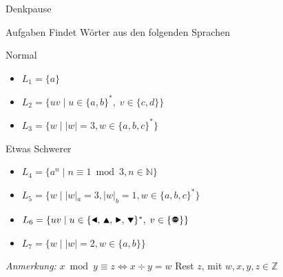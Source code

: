 {
\begin{frame}[fragile]{Denkpause}
    \footnotesize
        \begin{alertblock}{Aufgaben}
            Findet Wörter aus den folgenden Sprachen
        \end{alertblock}
        \begin{block}{Normal}
            \begin{itemize}
                \item $L_1 = \{a\}$
                \item $L_2 = \{uv\;|\;u\in\{a,b\}^\ast,\;v\in\{c,d\}\}$
                \item $L_3 = \{w\;|\;|w| = 3, w\in \{a,b,c\}^{*}\}$
            \end{itemize}
        \end{block}
        \begin{block}{Etwas Schwerer}
            \begin{itemize}
                \item $L_4 = \{a^n\;|\;n \equiv 1 \bmod 3, n\in\mathbb{N}\}$
                \item $L_5 = \{w\;|\;|w|_a = 3, |w|_b = 1, w\in \{a,b,c\}^{*}\}$
                \item $L_6 = \{uv\;|\;u\in\{\text{\Rewind, \MoveUp, \Forward, \MoveDown}\}^\ast,\;v\in\{\text{\Stopsign}\}\}$
                \item $L_7 = \{w \mid |w| = 2, w\in \{a,b\}\}$
            \end{itemize}
        \end{block}
        \emph{Anmerkung:} $x \bmod y \equiv z \iff x\div y = w$ Rest $z$, mit $w,x,y,z \in \mathbb{Z}$
\end{frame}
}

